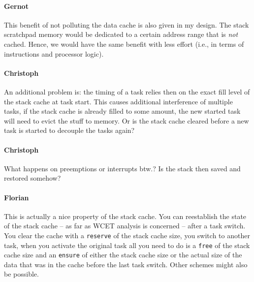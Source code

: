 \documentclass{IEEEtran}
\newcommand{\comment}[3]{\paragraph*{\textbf{#1}}{\color{#3}#2}}
\newcommand{\martin}[1]{\comment{Martin}{#1}{Blue}}
\newcommand{\stefan}[1]{\comment{Stefan}{#1}{RoyalPurple}}
\newcommand{\cullmann}[1]{\comment{Christoph}{#1}{Maroon}}
\newcommand{\gebhard}[1]{\comment{Gernot}{#1}{RedOrange}}
\newcommand{\fb}[1]{\comment{Florian}{#1}{Emerald}}
\begin{document}
\gebhard{This benefit of not polluting the data cache is also given in my design.
The stack scratchpad memory would be dedicated to a certain address range that is \emph{not} cached.
Hence, we would have the same benefit with less effort (i.e., in terms of instructions and processor logic).}

\cullmann{An additional problem is: the timing of a task relies then on the exact fill level of the stack cache at task start.
This causes additional interference of multiple tasks, if the stack cache is already filled to some amount, the new started task will need to evict the stuff to memory.
Or is the stack cache cleared before a new task is started to decouple the tasks again?}

\cullmann{What happens on preemptions or interrupts btw.? Is the stack then saved and restored somehow?}

\fb{This is actually a nice property of the stack cache. You can reestablish the
state of the stack cache -- as far as WCET analysis is concerned -- after a task
switch. You clear the cache with a \texttt{reserve} of the stack cache size, you
switch to another task, when you activate the original task all you need to do
is a \texttt{free} of the stack cache size and an \texttt{ensure} of either
the stack cache size or the actual size of the data that was in the cache before
the last task switch. Other schemes might also be possible.}

\end{document}
